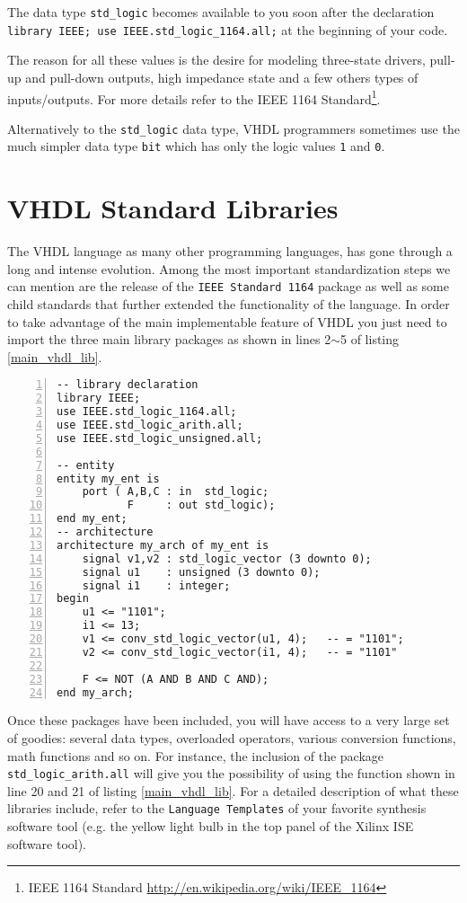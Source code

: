 The data type \texttt{std\_logic} becomes available to you soon after the declaration \texttt{library IEEE; use IEEE.std\_logic\_1164.all;} at the beginning of your code.

The reason for all these values is the desire for modeling three-state drivers, pull-up and pull-down outputs, high impedance state and a few others types of inputs/outputs. For more details refer to the IEEE 1164 Standard\footnote{IEEE 1164 Standard \url{http://en.wikipedia.org/wiki/IEEE_1164}}.

Alternatively to the \texttt{std\_logic} data type, VHDL programmers sometimes use the much simpler data type \texttt{bit} which has only the logic values \texttt{1} and \texttt{0}.

\section{VHDL Standard Libraries}
The VHDL language as many other programming languages, has gone through a long and intense evolution. Among the most important standardization steps we can mention are the release of the \texttt{IEEE Standard 1164} package as well as some child standards that further extended the functionality of the language. In order to take advantage of the main implementable feature of VHDL you just need to import the three main library packages as shown in lines 2$\sim$5 of listing \ref{main_vhdl_lib}.

\begin{minipage}{0.98\linewidth}
\begin{lstlisting}[numbers=left,label=main_vhdl_lib, caption=Typical inclusions of IEEE standard libraries.]
-- library declaration
library IEEE;
use IEEE.std_logic_1164.all;
use IEEE.std_logic_arith.all;
use IEEE.std_logic_unsigned.all;

-- entity
entity my_ent is
	port ( A,B,C : in  std_logic;
	       F     : out std_logic);
end my_ent;
-- architecture
architecture my_arch of my_ent is
    signal v1,v2 : std_logic_vector (3 downto 0);
    signal u1    : unsigned (3 downto 0);
    signal i1    : integer;
begin
    u1 <= "1101";
    i1 <= 13;
    v1 <= conv_std_logic_vector(u1, 4);   -- = "1101";
    v2 <= conv_std_logic_vector(i1, 4);   -- = "1101"

	F <= NOT (A AND B AND C AND);	
end my_arch;
\end{lstlisting}
\end{minipage}

Once these packages have been included, you will have access to a very large set of goodies: several data types, overloaded operators, various conversion functions, math functions and so on. For instance, the inclusion of the package \texttt{std\_logic\_arith.all} will give you the possibility of using the function shown in line 20 and 21 of listing \ref{main_vhdl_lib}. For a detailed description of what these libraries include, refer to the \texttt{Language Templates} of your favorite synthesis software tool (e.g. the yellow light bulb in the top panel of the Xilinx ISE software tool).

